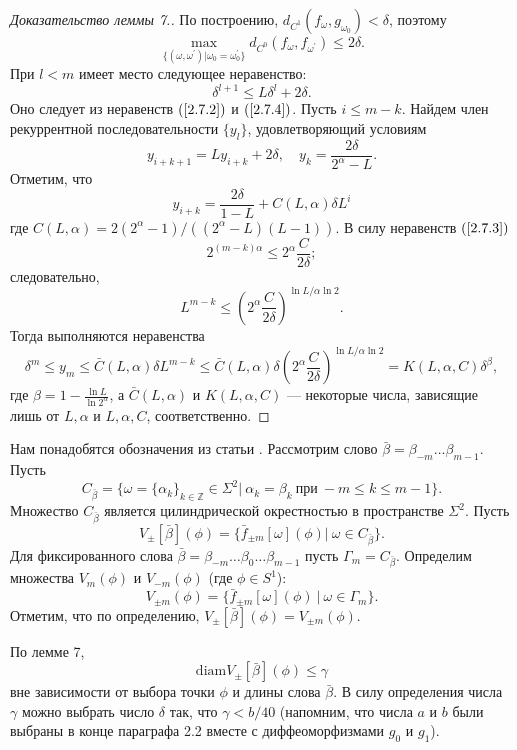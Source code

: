 \documentclass[12pt]{article}
\begin{document}
\begin{proof}[Доказательство леммы 7.]
По построению, $d_{C^1}(f_{\omega},g_{\omega_0})<\delta$, поэтому
\begin{equation}
\label{2.7.4}
\max_{\{(\omega,\omega^{\prime})|\omega_0=\omega_0^{\prime}\}} d_{C^0}(f_{\omega},f_{\omega^{\prime}})\leq 2\delta.
\end{equation}
При $l<m$ имеет место следующее неравенство:
$$\delta^{l+1}\leq L\delta^l+2\delta.$$
Оно следует из неравенств $(\ref{2.7.2})$ и $(\ref{2.7.4})$. Пусть $i\leq m-k$. Найдем член рекуррентной последовательности $\{y_l\}$, удовлетворяющий условиям
$$y_{i+k+1}=Ly_{i+k}+2\delta,\quad y_k=\frac{2\delta}{2^\alpha-L}.$$
Отметим, что
$$y_{i+k}=\frac{2\delta}{1-L}+C(L,\alpha)\delta L^{i}$$
где $C(L,\alpha)=2(2^{\alpha}-1)/((2^{\alpha}-L)(L-1))$.
В силу неравенств $(\ref{2.7.3})$
$$2^{(m-k)\alpha}\leq 2^{\alpha}\frac{C}{2\delta};$$ 
следовательно,
$$L^{m-k}\leq\left(2^{\alpha}\frac{C}{2\delta}\right)^{\ln L/\alpha\ln 2}.$$
Тогда выполняются неравенства
$$\delta^m\leq y_m\leq \bar{C}(L,\alpha)\delta L^{m-k}\leq \bar{C}(L,\alpha)\delta\left(2^{\alpha}\frac{C}{2\delta}\right)^{\ln L/\alpha\ln 2}=K(L,\alpha,C)\delta^{\beta},$$
где $\beta=1-\frac{\ln L}{\ln 2^{\alpha}}$, а $\bar{C}(L,\alpha)$ и $K(L,\alpha,C)$ --- некоторые числа, зависящие лишь от $L,\alpha$ и $L,\alpha,C$, соответственно. 
\end{proof}

Нам понадобятся обозначения из статьи \cite{17}. Рассмотрим слово $\bar{\beta}=\beta_{-m}\ldots\beta_{m-1}$. Пусть
$$C_{\bar{\beta}}=\{\omega=\{\alpha_k\}_{k\in\mathbb{Z}}\in\Sigma^2|\ \alpha_k=\beta_k\ \textrm{при}\ -m\leq k\leq m-1\}.$$
Множество $C_{\bar{\beta}}$ является цилиндрической окрестностью в пространстве $\Sigma^2$. Пусть
$$V_{\pm}[\bar{\beta}](\phi)=\{\bar{f}_{\pm m}[\omega](\phi)|\ \omega\in C_{\bar{\beta}}\}.$$
Для фиксированного слова $\bar{\beta}=\beta_{-m}\ldots\beta_0\ldots\beta_{m-1}$ пусть $\Gamma_m=C_{\bar{\beta}}$.
Определим множества $V_m(\phi)$ и $V_{-m}(\phi)$ (где $\phi\in S^1$):
$$V_{\pm m}(\phi)=\{\bar{f}_{\pm m}[\omega](\phi)\ |\ \omega\in\Gamma_m\}.$$ 
Отметим, что по определению, $V_{\pm}[\bar{\beta}](\phi)=V_{\pm m}(\phi)$.

 По лемме 7, 
$$\textrm{diam}V_{\pm}[\bar{\beta}](\phi)\leq\gamma$$
вне зависимости от выбора точки $\phi$ и длины слова $\bar{\beta}$. В силу определения числа $\gamma$ можно выбрать число $\delta$ так, что $\gamma<b/40$ (напомним, что числа $a$ и $b$ были выбраны в конце параграфа 2.2 вместе с диффеоморфизмами $g_0$ и $g_1$).
\end{document}
